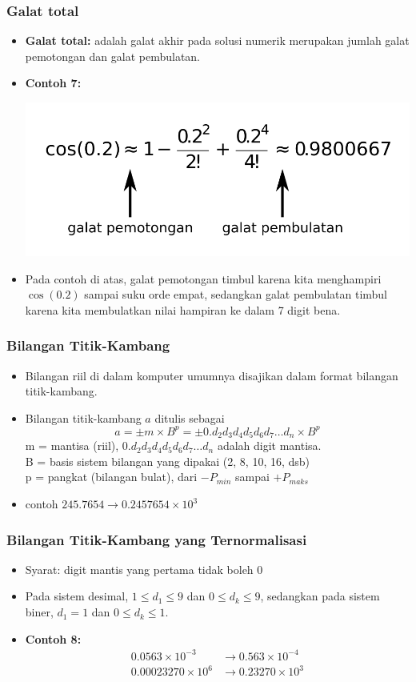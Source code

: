 \documentclass[pdflatex,compress]{beamer}
\begin{document}
\begin{frame}
	\frametitle{Galat total}
	\begin{itemize}
		\item \textbf{Galat total:} adalah galat akhir pada solusi numerik merupakan jumlah galat pemotongan dan galat pembulatan.
		\item \textbf{Contoh 7:}
		\begin{center}
			\includegraphics[width=0.6\linewidth]{img/img103.png}
		\end{center}
		\item Pada contoh di atas, galat pemotongan timbul karena kita menghampiri $ \cos(0.2) $ sampai suku orde empat, sedangkan galat pembulatan timbul karena kita membulatkan nilai hampiran ke dalam 7 digit bena.
	\end{itemize}
\end{frame}

\begin{frame}
	\frametitle{Bilangan Titik-Kambang}
	\begin{itemize}
		\item Bilangan riil di dalam komputer umumnya disajikan dalam format bilangan titik-kambang.
		\item Bilangan titik-kambang $ a $ ditulis sebagai
		\[ a = \pm m \times B^p = \pm 0.d_2 d_3 d_4 d_5 d_6 d_7 \dots d_n \times B^p \]
		m = mantisa (riil), $ 0.d_2 d_3 d_4 d_5 d_6 d_7 \dots d_n $ adalah digit mantisa.\\
		B = basis sistem bilangan yang dipakai (2, 8, 10, 16, dsb)\\
		p = pangkat (bilangan bulat), dari $ -P_{min} $ sampai $ +P_{maks} $
		\item contoh $ 245.7654 \rightarrow 0.2457654 \times 10^3 $
	\end{itemize}
\end{frame}

\begin{frame}
	\frametitle{Bilangan Titik-Kambang yang Ternormalisasi}
	\begin{itemize}
		\item Syarat: digit mantis yang pertama tidak boleh 0
		\item Pada sistem desimal, $ 1 \leq d_1 \leq 9 $ dan $ 0 \leq d_k \leq 9 $,
		sedangkan pada sistem biner, $ d_1 = 1 $ dan $ 0 \leq d_k \leq 1 $.
		\item \textbf{Contoh 8:} 
		\begin{align*}
			0.0563 \times 10^{-3} &\rightarrow 0.563 \times 10^{-4} \\
			0.00023270 \times 10^6 &\rightarrow 0.23270 \times 10^3
		\end{align*}
	\end{itemize}
\end{frame}
\end{document}
